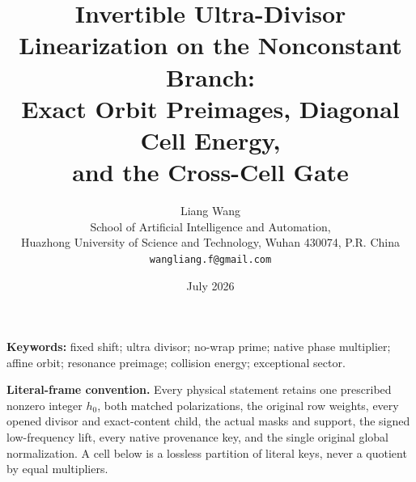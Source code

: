 \documentclass[11pt]{article}
\title{Invertible Ultra-Divisor Linearization on the Nonconstant Branch:\\
Exact Orbit Preimages, Diagonal Cell Energy,\\
and the Cross-Cell Gate}
\author{Liang Wang\\
School of Artificial Intelligence and Automation,\\
Huazhong University of Science and Technology, Wuhan 430074, P.R. China\\
\texttt{wangliang.f@gmail.com}}
\date{July 2026}
\theoremstyle{remark}
\begin{document}
\maketitle



\noindent\textbf{Keywords:} fixed shift; ultra divisor; no-wrap
prime; native phase multiplier; affine orbit; resonance preimage;
collision energy; exceptional sector.

\medskip
\noindent\textbf{Literal-frame convention.}
Every physical statement retains one prescribed nonzero integer
\(h_0\), both matched polarizations, the original row weights, every
opened divisor and exact-content child, the actual masks and support,
the signed low-frequency lift, every native provenance key, and the
single original global normalization.  A cell below is a lossless
partition of literal keys, never a quotient by equal multipliers.












\begingroup
\footnotesize
\raggedright


\endgroup
\end{document}
